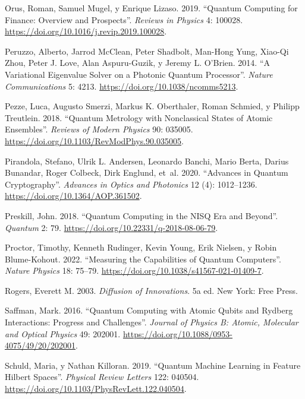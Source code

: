 \documentclass[
  11pt,
  letterpaper,
]{article}
\newlength{\cslhangindent}
\newenvironment{CSLReferences}[2] %
 {\begin{list}{}{%
  \setlength{\itemindent}{0pt}
  \setlength{\leftmargin}{0pt}
  \setlength{\parsep}{0pt}
  \ifodd #1
   \setlength{\leftmargin}{\cslhangindent}
   \setlength{\itemindent}{-1\cslhangindent}
  \fi
  \setlength{\itemsep}{#2\baselineskip}}}
 {\end{list}}
\begin{document}
\begin{CSLReferences}{1}{0}
Orus, Roman, Samuel Mugel, y Enrique Lizaso. 2019. {``Quantum Computing
for Finance: Overview and Prospects''}. \emph{Reviews in Physics} 4:
100028. \url{https://doi.org/10.1016/j.revip.2019.100028}.

Peruzzo, Alberto, Jarrod McClean, Peter Shadbolt, Man-Hong Yung, Xiao-Qi
Zhou, Peter J. Love, Alan Aspuru-Guzik, y Jeremy L. O'Brien. 2014. {``A
Variational Eigenvalue Solver on a Photonic Quantum Processor''}.
\emph{Nature Communications} 5: 4213.
\url{https://doi.org/10.1038/ncomms5213}.

Pezze, Luca, Augusto Smerzi, Markus K. Oberthaler, Roman Schmied, y
Philipp Treutlein. 2018. {``Quantum Metrology with Nonclassical States
of Atomic Ensembles''}. \emph{Reviews of Modern Physics} 90: 035005.
\url{https://doi.org/10.1103/RevModPhys.90.035005}.

Pirandola, Stefano, Ulrik L. Andersen, Leonardo Banchi, Mario Berta,
Darius Bunandar, Roger Colbeck, Dirk Englund, et~al. 2020. {``Advances
in Quantum Cryptography''}. \emph{Advances in Optics and Photonics} 12
(4): 1012--1236. \url{https://doi.org/10.1364/AOP.361502}.

Preskill, John. 2018. {``Quantum Computing in the NISQ Era and
Beyond''}. \emph{Quantum} 2: 79.
\url{https://doi.org/10.22331/q-2018-08-06-79}.

Proctor, Timothy, Kenneth Rudinger, Kevin Young, Erik Nielsen, y Robin
Blume-Kohout. 2022. {``Measuring the Capabilities of Quantum
Computers''}. \emph{Nature Physics} 18: 75--79.
\url{https://doi.org/10.1038/s41567-021-01409-7}.

Rogers, Everett M. 2003. \emph{Diffusion of Innovations}. 5a ed. New
York: Free Press.

Saffman, Mark. 2016. {``Quantum Computing with Atomic Qubits and Rydberg
Interactions: Progress and Challenges''}. \emph{Journal of Physics B:
Atomic, Molecular and Optical Physics} 49: 202001.
\url{https://doi.org/10.1088/0953-4075/49/20/202001}.

Schuld, Maria, y Nathan Killoran. 2019. {``Quantum Machine Learning in
Feature Hilbert Spaces''}. \emph{Physical Review Letters} 122: 040504.
\url{https://doi.org/10.1103/PhysRevLett.122.040504}.


\end{CSLReferences}
\end{document}
